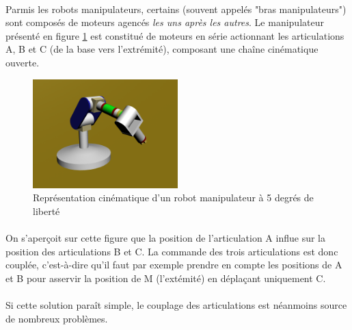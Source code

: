 \documentclass[a4paper,10pt]{article}
\begin{document}
                \paragraph{}
                    Parmis les robots manipulateurs, certains (souvent
                    appelés "bras manipulateurs") sont composés de moteurs 
                    agencés \textit{les uns après les autres}. Le manipulateur
                    présenté en figure \ref{fig:robotarm} est constitué de moteurs en série actionnant
                    les articulations A, B et C (de la base vers l'extrémité), composant une chaîne cinématique ouverte. 
                    
                    
                \begin{figure}[h!]
                    \centering
                    \includegraphics[width=0.5\textwidth]{Robot_arm_model_1.png}
                    \caption{Représentation cinématique d'un robot manipulateur à 5 degrés de liberté} 
                    \label{fig:robotarm}
                \end{figure}
                    
                \paragraph{}
                    On s'aperçoit sur cette figure que la position de 
                    l'articulation A influe sur la position des articulations
                    B et C. La commande des trois articulations est donc couplée, 
                    c'est-à-dire qu'il faut par exemple prendre en compte les positions
                    de A et B pour asservir la position de M (l'extémité) en déplaçant uniquement
                    C. 
            
                \paragraph{}
                    Si cette solution paraît simple, le couplage des articulations est
                    néanmoins source de nombreux problèmes.
                    
\end{document}
